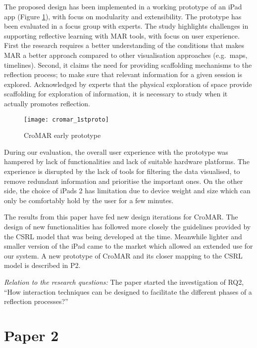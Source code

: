 The proposed design has been implemented in a working prototype of an iPad app (Figure \ref{fig:cromar-prototype}), with focus on modularity and extensibility. The prototype has been evaluated in a focus group with experts. The study highlights challenges in supporting reflective learning with MAR tools, with focus on user experience. First the research requires a better understanding of the conditions that makes MAR a better approach compared to other visualisation approaches (e.g.~maps, timelines). Second, it claims the need for providing scaffolding mechanisms to the reflection process; to make sure that relevant information for a given session is explored. Acknowledged by experts that the physical exploration of space provide scaffolding for exploration of information, it is necessary to study when it actually promotes reflection.
\begin{figure}
	[tbh] \centering 
	\texttt{[image: cromar\_1stproto]} \caption{CroMAR early prototype} \label{fig:cromar-prototype} 
\end{figure}

During our evaluation, the overall user experience with the prototype was hampered by lack of functionalities and lack of suitable hardware platforms. The experience is disrupted by the lack of tools for filtering the data visualised, to remove redundant information and prioritise the important ones. On the other side, the choice of iPads 2 has limitation due to device weight and size which can only be comfortably hold by the user for a few minutes.

The results from this paper have fed new design iterations for CroMAR. The design of new functionalities has followed more closely the guidelines provided by the CSRL model that was being developed at the time. Meanwhile lighter and smaller version of the iPad came to the market which allowed an extended use for our system. A new prototype of CroMAR and its closer mapping to the CSRL model is described in P2.

\emph{Relation to the research questions: } The paper started the investigation of RQ2, ``How interaction techniques can be designed to facilitate the different phases of a reflection processes?'' 

\section[Supporting Debriefing with Sensor Data: A Reflective Approach to Crisis Training]{Paper 2}\label{paper-2}

